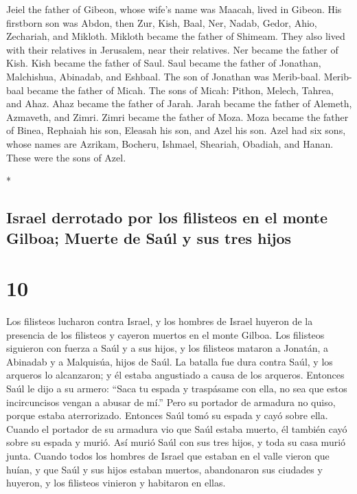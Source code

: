 \begin{paracol}{2}
\begin{otherlanguage}{english}
 Jeiel the father of Gibeon, whose wife's name was
Maacah, lived in Gibeon.  His firstborn son was Abdon,
then Zur, Kish, Baal, Ner, Nadab,  Gedor, Ahio,
Zechariah, and Mikloth.  Mikloth became the father of
Shimeam. They also lived with their relatives in Jerusalem, near their
relatives.  Ner became the father of Kish. Kish became
the father of Saul. Saul became the father of Jonathan, Malchishua,
Abinadab, and Eshbaal.  The son of Jonathan was
Merib-baal. Merib-baal became the father of Micah.  The
sons of Micah: Pithon, Melech, Tahrea, and Ahaz.  Ahaz
became the father of Jarah. Jarah became the father of Alemeth,
Azmaveth, and Zimri. Zimri became the father of Moza. 
Moza became the father of Binea, Rephaiah his son, Eleasah his son, and
Azel his son.  Azel had six sons, whose names are
Azrikam, Bocheru, Ishmael, Sheariah, Obadiah, and Hanan. These were the
sons of Azel.

\end{otherlanguage}

\switchcolumn[0]*

\hypertarget{israel-derrotado-por-los-filisteos-en-el-monte-gilboa-muerte-de-sauxfal-y-sus-tres-hijos}{%
\subsection{Israel derrotado por los filisteos en el monte Gilboa;
Muerte de Saúl y sus tres
hijos}\label{israel-derrotado-por-los-filisteos-en-el-monte-gilboa-muerte-de-sauxfal-y-sus-tres-hijos}}

\hypertarget{section-18}{%
\section{10}\label{section-18}}

 Los filisteos lucharon contra Israel, y los hombres de
Israel huyeron de la presencia de los filisteos y cayeron muertos en el
monte Gilboa.  Los filisteos siguieron con fuerza a Saúl y
a sus hijos, y los filisteos mataron a Jonatán, a Abinadab y a
Malquisúa, hijos de Saúl.  La batalla fue dura contra
Saúl, y los arqueros lo alcanzaron; y él estaba angustiado a causa de
los arqueros.  Entonces Saúl le dijo a su armero: ``Saca
tu espada y traspásame con ella, no sea que estos incircuncisos vengan a
abusar de mí.'' Pero su portador de armadura no quiso, porque estaba
aterrorizado. Entonces Saúl tomó su espada y cayó sobre ella.
 Cuando el portador de su armadura vio que Saúl estaba
muerto, él también cayó sobre su espada y murió.  Así
murió Saúl con sus tres hijos, y toda su casa murió junta.
 Cuando todos los hombres de Israel que estaban en el
valle vieron que huían, y que Saúl y sus hijos estaban muertos,
abandonaron sus ciudades y huyeron, y los filisteos vinieron y habitaron
en ellas.


\end{paracol}
